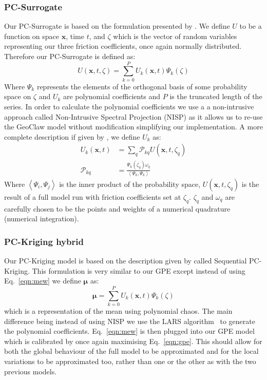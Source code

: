 \documentclass[12pt,a4paper]{article}
\begin{document}
\subsubsection{PC-Surrogate}
\noindent
Our PC-Surrogate is based on the formulation presented by . We define $U$ to be a function on space $\bm{x}$, time $t$, and $\zeta$ which is the vector of random variables representing our three friction coefficients, once again normally distributed. Therefore our PC-Surrogate is defined as:
\begin{equation}
	U(\bm{x},t,\zeta)=\sum_{k=0}^{P}U_k(\bm{x},t)\Psi_k(\zeta)
\end{equation}
Where $\Psi_k$ represents the elements of the orthogonal basis of some probability space on $\zeta$ and $U_k$ are polynomial coefficients and $P$ is the truncated length of the series. In order to calculate the polynomial coefficients we use a a non-intrusive approach called Non-Intrusive Spectral Projection (NISP) as it allows us to re-use the GeoClaw model without modification simplifying our implementation. A more complete description if given by , we define $U_k$ as:
\begin{align}
	U_k(\bm{x},t) &= \sum_{q}\mathcal{P}_{kq}U(\bm{x},t,\zeta_q) \\
	\mathcal{P}_{kq} &= \frac{\Psi_k(\zeta_q)\omega_q}{\left<\Psi_k, \Psi_k \right>}
\end{align}
Where $\left<\Psi_i,\Psi_j \right>$ is the inner product of the probability space, $U(\bm{x},t,\zeta_q)$ is the result of a full model run with friction coefficients set at $\zeta_q$. $\zeta_q$ and $\omega_q$ are carefully chosen to be the points and weights of a numerical quadrature (numerical integration).
\subsubsection{PC-Kriging hybrid}
\noindent
Our PC-Kriging model is based on the description given by  called Sequential PC-Kriging. This formulation is very similar to our GPE except instead of using Eq.~\eqref{eqn:mew} we define $\bm{\mu}$ as:
\begin{equation}
	\bm{\mu} = \sum_{k=0}^{P}U_k(\bm{x},t)\Psi_k(\zeta)
\end{equation}
which is a representation of the mean using polynomial chaos. The main difference being instead of using NISP we use the LARS algorithm~\cite{lar} to generate the polynomial coefficients. Eq.~\eqref{eqn:mew} is then plugged into our GPE model which is calibrated by once again maximising Eq.~\eqref{eqn:gpe}. This should allow for both the global behaviour of the full model to be approximated and for the local variations to be approximated too, rather than one or the other as with the two previous models.
\end{document}
